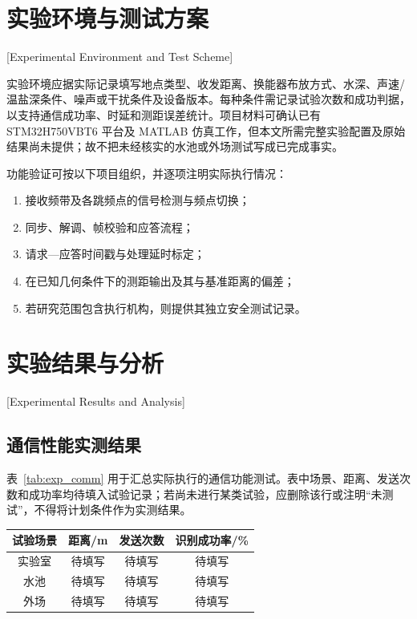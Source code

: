 \section{实验环境与测试方案}[Experimental Environment and Test Scheme]

实验环境应据实际记录填写地点类型、收发距离、换能器布放方式、水深、声速/温盐深条件、噪声或干扰条件及设备版本。每种条件需记录试验次数和成功判据，以支持通信成功率、时延和测距误差统计。项目材料可确认已有 STM32H750VBT6 平台及 MATLAB 仿真工作，但本文所需完整实验配置及原始结果尚未提供；故不把未经核实的水池或外场测试写成已完成事实。

功能验证可按以下项目组织，并逐项注明实际执行情况：
\begin{enumerate}
  \item 接收频带及各跳频点的信号检测与频点切换；
  \item 同步、解调、帧校验和应答流程；
  \item 请求—应答时间戳与处理延时标定；
  \item 在已知几何条件下的测距输出及其与基准距离的偏差；
  \item 若研究范围包含执行机构，则提供其独立安全测试记录。
\end{enumerate}

\section{实验结果与分析}[Experimental Results and Analysis]

\subsection{通信性能实测结果}

表~\ref{tab:exp_comm} 用于汇总实际执行的通信功能测试。表中场景、距离、发送次数和成功率均待填入试验记录；若尚未进行某类试验，应删除该行或注明“未测试”，不得将计划条件作为实测结果。

\begin{table}[htbp]
  \vspace{0.5em}\centering\wuhao
  \begin{tabular}{cccc}
    \toprule[1.5pt]
    试验场景 & 距离/m & 发送次数 & 识别成功率/\% \\
    \midrule[1pt]
    实验室 & 待填写 & 待填写 & 待填写 \\
    水池 & 待填写 & 待填写 & 待填写 \\
    外场 & 待填写 & 待填写 & 待填写 \\
    \bottomrule[1.5pt]
  \end{tabular}
\end{table}

